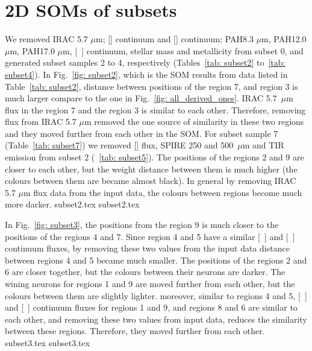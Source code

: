 \section{2D SOMs of subsets}
\label{sec: app_2d_soms_SOMN}

        We removed IRAC 5.7 $\mu$m; [\sii] continuum and [\oiii] continuum; PAH8.3 $\mu$m, PAH12.0 $\mu$m, PAH17.0 $\mu$m, [~\oiii] continuum, stellar mass and metallicity from subset 0, and generated subset samples 2 to 4, respectively (Tables~\ref{tab: subset2} to~\ref{tab: subset4}).
        In Fig.~\ref{fig: subset2}, which is the SOM results from data listed in Table~\ref{tab: subset2}, distance between positions of the region 7, and region 3 is much larger compare to the one in Fig.~\ref{fig: all_derived_ones}. 
        IRAC 5.7~$\mu$m flux in the region 7 and the region 3 is similar to each other. 
        Therefore, removing flux from IRAC 5.7 $\mu$m removed the one source of similarity in these two regions and they moved further from each other in the SOM.
        For subset sample 7 (Table~\ref{tab: subset7}) we removed [\sii] flux, SPIRE 250 and 500~$\mu$m and TIR emission from subset 2 (~\ref{tab: subset5}).
        The positions of the regions 2 and 9 are closer to each other, but the weight distance between them is much higher (the colours between them are became almost black). 
        In general by removing IRAC 5.7 $\mu$m  flux data from the input data, the colours between regions become much more darker.
        {subset2.tex}
        {subset2.tex}
        
        In Fig.~\ref{fig: subset3}, the positions from the region 9 is much closer to the positions of the regions 4 and 7. 
        Since region 4 and 5 have a similar [~\oiii] and [~\sii] continuum fluxes, by removing these two values from the input data distance between regions 4 and 5 became much smaller.
        The positions of the regions 2 and 6 are closer together, but the colours between their neurons are darker.
        The wining neurons for regions 1 and 9 are moved further from each other, but the colours between them are slightly lighter. 
        moreover, similar to regions 4 and 5, [~\oiii] and [~\sii] continuum fluxes for regions 1 and 9, and regions 8 and 6 are similar to each other, and removing these two values from input data, reduces the similarity between these regions. Therefore, they moved further from each other. 
        {subset3.tex}
        {subset3.tex}
        
